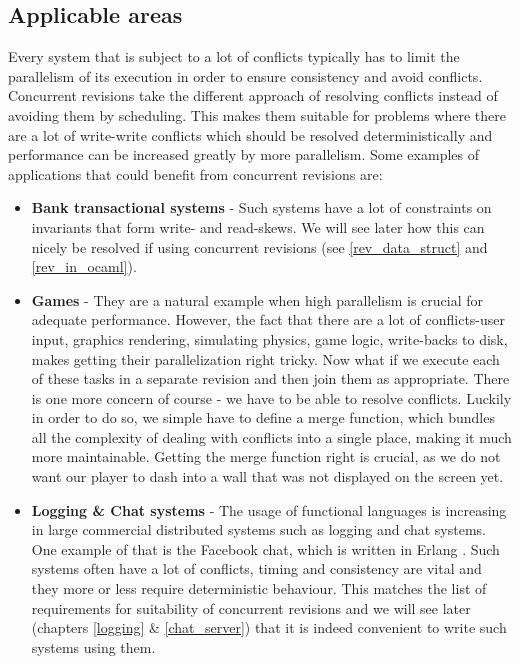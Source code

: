 \documentclass[12pt,twoside,notitlepage]{report}
\begin{document}
\subsection{Applicable areas}
Every system that is subject to a lot of conflicts typically has to limit the parallelism of its execution in order to ensure consistency and avoid conflicts. Concurrent revisions take the different approach of resolving conflicts instead of avoiding them by scheduling. This makes them suitable for problems where there are a lot of write-write conflicts which should be resolved deterministically and performance can be increased greatly by more parallelism. Some examples of applications that could benefit from concurrent revisions are: 

\begin{itemize}


\item
{\bfseries Bank transactional systems} - Such systems have a lot of constraints on invariants that form write- and read-skews. We will see later how this can nicely be resolved if using concurrent revisions (see \ref{rev_data_struct} and \ref{rev_in_ocaml}). 

\item
{\bfseries Games} - They are a natural example when high parallelism is crucial for adequate performance. However, the fact that there are a lot of conflicts-user input, graphics rendering, simulating physics, game logic, write-backs to disk, makes getting their parallelization right tricky. Now what if we execute each of these tasks in a separate revision and then join them as appropriate. There is one more concern of course - we have to be able to resolve conflicts. Luckily in order to do so, we simple have to define a merge function, which bundles all the complexity of dealing with conflicts into a single place, making it much more maintainable. Getting the merge function right is crucial, as we do not want our player to dash into a wall that was not displayed on the screen yet.

\item
{\bfseries Logging \& Chat systems} - The usage of functional languages is increasing in large commercial distributed systems such as logging and chat systems. One example of that is the Facebook chat, which is written in Erlang \cite{erlang}. Such systems often have a lot of conflicts, timing and consistency are vital and they more or less require deterministic behaviour. This matches the list of requirements for suitability of concurrent revisions and we will see later (chapters \ref{logging} \& \ref{chat_server}) that it is indeed convenient to write such systems using them. 

\end{itemize}
\end{document}
